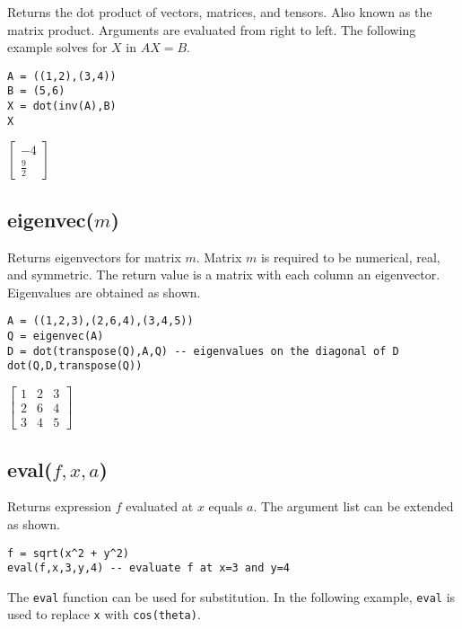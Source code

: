\documentclass[12pt]{article}
\begin{document}
Returns the dot product of vectors, matrices, and tensors.
Also known as the matrix product.
Arguments are evaluated from right to left.
The following example solves for $X$ in $AX=B$.

{\color{blue}
\begin{verbatim}
A = ((1,2),(3,4))
B = (5,6)
X = dot(inv(A),B)
X
\end{verbatim}
}

\noindent
$\displaystyle
\begin{bmatrix}
-4
\\[1ex]
\tfrac{9}{2}
\end{bmatrix}
$

\subsection*{eigenvec($m$)}

Returns eigenvectors for matrix $m$.
Matrix $m$ is required to be numerical, real, and symmetric.
The return value is a matrix with each column an eigenvector.
Eigenvalues are obtained as shown.

{\color{blue}
\begin{verbatim}
A = ((1,2,3),(2,6,4),(3,4,5))
Q = eigenvec(A)
D = dot(transpose(Q),A,Q) -- eigenvalues on the diagonal of D
dot(Q,D,transpose(Q))
\end{verbatim}
}

\noindent
$\displaystyle
\begin{bmatrix}
1 & 2 & 3
\\[1ex]
2 & 6 & 4
\\[1ex]
3 & 4 & 5
\end{bmatrix}
$

\subsection*{eval($f,x,a$)}

Returns expression $f$ evaluated at $x$ equals $a$.
The argument list can be extended as shown.

{\color{blue}
\begin{verbatim}
f = sqrt(x^2 + y^2)
eval(f,x,3,y,4) -- evaluate f at x=3 and y=4
\end{verbatim}
}


\bigskip
\noindent
The \verb$eval$ function can be used for substitution.
In the following example, \verb$eval$ is used to replace
\verb$x$ with \verb$cos(theta)$.
\end{document}
